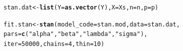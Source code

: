 \documentclass[]{beamer}\usepackage[]{graphicx}\usepackage[]{color}
\makeatletter
\newcommand{\hlnum}[1]{\textcolor[rgb]{0.686,0.059,0.569}{#1}}%
\newcommand{\hlstr}[1]{\textcolor[rgb]{0.192,0.494,0.8}{#1}}%
\newcommand{\hlstd}[1]{\textcolor[rgb]{0.345,0.345,0.345}{#1}}%
\newcommand{\hlkwb}[1]{\textcolor[rgb]{0.69,0.353,0.396}{#1}}%
\newcommand{\hlkwc}[1]{\textcolor[rgb]{0.333,0.667,0.333}{#1}}%
\newcommand{\hlkwd}[1]{\textcolor[rgb]{0.737,0.353,0.396}{\textbf{#1}}}%
\newenvironment{kframe}{%
 \def\at@end@of@kframe{}%
 \ifinner\ifhmode%
  \def\at@end@of@kframe{\end{minipage}}%
  \begin{minipage}{\columnwidth}%
 \fi\fi%
 \def\FrameCommand##1{\hskip\@totalleftmargin \hskip-\fboxsep
 \colorbox{shadecolor}{##1}\hskip-\fboxsep
     \hskip-\linewidth \hskip-\@totalleftmargin \hskip\columnwidth}%
 \MakeFramed {\advance\hsize-\width
   \@totalleftmargin\z@ \linewidth\hsize
   \@setminipage}}%
 {\par\unskip\endMakeFramed%
 \at@end@of@kframe}
\newenvironment{knitrout}{}{} %
\makeatother
\begin{document}
\newsavebox{\standata}
\begin{lrbox}{\standata}
\begin{knitrout}\small
{}\color{fgcolor}\begin{kframe}
\begin{alltt}
\hlstd{stan.dat} \hlkwb{<-} \hlkwd{list}\hlstd{(}\hlkwc{Y} \hlstd{=} \hlkwd{as.vector}\hlstd{(Y),} \hlkwc{X} \hlstd{= Xs,} \hlkwc{n} \hlstd{= n,} \hlkwc{p} \hlstd{= p)}
\end{alltt}
\end{kframe}
\end{knitrout}
\end{lrbox}

\newsavebox{\stansamp}
\begin{lrbox}{\stansamp}
\begin{knitrout}\small
{}\color{fgcolor}\begin{kframe}
\begin{alltt}
\hlstd{fit.stan} \hlkwb{<-} \hlkwd{stan}\hlstd{(}\hlkwc{model_code} \hlstd{= stan.mod,} \hlkwc{data} \hlstd{= stan.dat,}
                 \hlkwc{pars} \hlstd{=} \hlkwd{c}\hlstd{(}\hlstr{"alpha"}\hlstd{,} \hlstr{"beta"}\hlstd{,} \hlstr{"lambda"}\hlstd{,} \hlstr{"sigma"}\hlstd{),}
                 \hlkwc{iter} \hlstd{=} \hlnum{50000}\hlstd{,} \hlkwc{chains} \hlstd{=} \hlnum{4}\hlstd{,} \hlkwc{thin} \hlstd{=} \hlnum{10}\hlstd{)}
\end{alltt}
\end{kframe}
\end{knitrout}
\end{lrbox}
\end{document}
